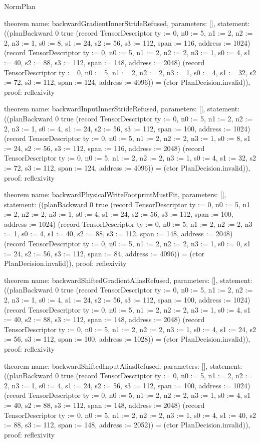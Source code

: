 \begin{lexlean}{NormPlan}
\begin{semanticmodule}
theorem{
  name: backwardGradientInnerStrideRefused,
  parameters: [],
  statement: ((planBackward 0 true (record TensorDescriptor {ty := 0, n0 := 5, n1 := 2, n2 := 2, n3 := 1, s0 := 8, s1 := 24, s2 := 56, s3 := 112, span := 116, address := 1024}) (record TensorDescriptor {ty := 0, n0 := 5, n1 := 2, n2 := 2, n3 := 1, s0 := 4, s1 := 40, s2 := 88, s3 := 112, span := 148, address := 2048}) (record TensorDescriptor {ty := 0, n0 := 5, n1 := 2, n2 := 2, n3 := 1, s0 := 4, s1 := 32, s2 := 72, s3 := 112, span := 124, address := 4096})) = (ctor PlanDecision.invalid)),
  proof: reflexivity{}
}

theorem{
  name: backwardInputInnerStrideRefused,
  parameters: [],
  statement: ((planBackward 0 true (record TensorDescriptor {ty := 0, n0 := 5, n1 := 2, n2 := 2, n3 := 1, s0 := 4, s1 := 24, s2 := 56, s3 := 112, span := 100, address := 1024}) (record TensorDescriptor {ty := 0, n0 := 5, n1 := 2, n2 := 2, n3 := 1, s0 := 8, s1 := 24, s2 := 56, s3 := 112, span := 116, address := 2048}) (record TensorDescriptor {ty := 0, n0 := 5, n1 := 2, n2 := 2, n3 := 1, s0 := 4, s1 := 32, s2 := 72, s3 := 112, span := 124, address := 4096})) = (ctor PlanDecision.invalid)),
  proof: reflexivity{}
}

theorem{
  name: backwardPhysicalWriteFootprintMustFit,
  parameters: [],
  statement: ((planBackward 0 true (record TensorDescriptor {ty := 0, n0 := 5, n1 := 2, n2 := 2, n3 := 1, s0 := 4, s1 := 24, s2 := 56, s3 := 112, span := 100, address := 1024}) (record TensorDescriptor {ty := 0, n0 := 5, n1 := 2, n2 := 2, n3 := 1, s0 := 4, s1 := 40, s2 := 88, s3 := 112, span := 148, address := 2048}) (record TensorDescriptor {ty := 0, n0 := 5, n1 := 2, n2 := 2, n3 := 1, s0 := 0, s1 := 24, s2 := 56, s3 := 112, span := 84, address := 4096})) = (ctor PlanDecision.invalid)),
  proof: reflexivity{}
}

theorem{
  name: backwardShiftedGradientAliasRefused,
  parameters: [],
  statement: ((planBackward 0 true (record TensorDescriptor {ty := 0, n0 := 5, n1 := 2, n2 := 2, n3 := 1, s0 := 4, s1 := 24, s2 := 56, s3 := 112, span := 100, address := 1024}) (record TensorDescriptor {ty := 0, n0 := 5, n1 := 2, n2 := 2, n3 := 1, s0 := 4, s1 := 40, s2 := 88, s3 := 112, span := 148, address := 2048}) (record TensorDescriptor {ty := 0, n0 := 5, n1 := 2, n2 := 2, n3 := 1, s0 := 4, s1 := 24, s2 := 56, s3 := 112, span := 100, address := 1028})) = (ctor PlanDecision.invalid)),
  proof: reflexivity{}
}

theorem{
  name: backwardShiftedInputAliasRefused,
  parameters: [],
  statement: ((planBackward 0 true (record TensorDescriptor {ty := 0, n0 := 5, n1 := 2, n2 := 2, n3 := 1, s0 := 4, s1 := 24, s2 := 56, s3 := 112, span := 100, address := 1024}) (record TensorDescriptor {ty := 0, n0 := 5, n1 := 2, n2 := 2, n3 := 1, s0 := 4, s1 := 40, s2 := 88, s3 := 112, span := 148, address := 2048}) (record TensorDescriptor {ty := 0, n0 := 5, n1 := 2, n2 := 2, n3 := 1, s0 := 4, s1 := 40, s2 := 88, s3 := 112, span := 148, address := 2052})) = (ctor PlanDecision.invalid)),
  proof: reflexivity{}
}


\end{semanticmodule}
\end{lexlean}
